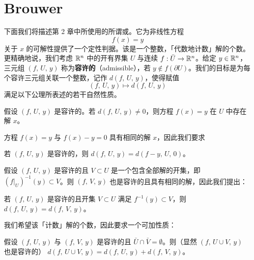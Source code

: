 
\section{Brouwer\trDegree}
\label{sec:brouwer-degree}


下面我们将描述第 2 章中所使用的所谓\trBrouwer\trDegree{}或\trMapping\trDegree。它为非线性方程
\begin{equation*}
f(x)=y
\end{equation*}
关于 $x$ 的可解性提供了一个定性判据。该\trDegree{}是一个整数，「代数地计数」解的个数。更精确地说，我们考虑 $\mathbb{R}^n$ 中的开有界集 $U$ 与连续\trMapping{} $f:\bar{U}\to\mathbb{R}^n$。给定 $y\in\mathbb{R}^n$，三元组 $(f,\,U,\,y)$ 称为\textbf{容许的}（admissible），若 $y\notin f(\partial U)$。我们的目标是为每个容许三元组关联一个整数，记作 $d(f,\,U,\,y)$，使得赋值
\begin{equation*}
(f,\,U,\,y)\longmapsto d(f,\,U,\,y)
\end{equation*}
满足以下公理所表述的若干自然性质。

\begin{axiom}[\trSolutionProperty]\label{ax:solution-property}
假设 $(f,\,U,\,y)$ 是容许的。若 $d(f,\,U,\,y)\neq 0$，则方程 $f(x)=y$ 在 $U$ 中存在解 $x$。
\end{axiom}

方程 $f(x)=y$ 与 $f(x)-y=0$ 具有相同的解 $x$，因此我们要求

\begin{axiom}[\trNaturality]\label{ax:naturality}
若 $(f,\,U,\,y)$ 是容许的，则
$d(f,\,U,\,y)=d(f-y,\,U,\,0)$。
\end{axiom}

假设 $(f,\,U,\,y)$ 是容许的且 $V\subset U$ 是一个包含全部解的开集，即 $(f|_{U})^{-1}(y)\subset V$。则 $(f,\,V,\,y)$ 也是容许的且具有相同的解，因此我们提出：

\begin{axiom}[\trExcision]\label{ax:excision}
若 $(f,\,U,\,y)$ 是容许的且开集 $V\subset U$ 满足 $f^{-1}(y)\subset V$，则
$d(f,\,U,\,y)=d(f,\,V,\,y)$。
\end{axiom}

我们希望该\trDegree{}「计数」解的个数，因此要求一个可加性质：

\begin{axiom}[\trAdditivity]\label{ax:additivity}
假设 $(f,\,U,\,y)$ 与 $(f,\,V,\,y)$ 是容许的且 $\bar{U}\cap\bar{V}=\emptyset$。则（显然 $(f,\,U\cup V,\,y)$ 也是容许的）
$d(f,\,U\cup V,\,y)=d(f,\,U,\,y)+d(f,\,V,\,y)$。
\end{axiom}

